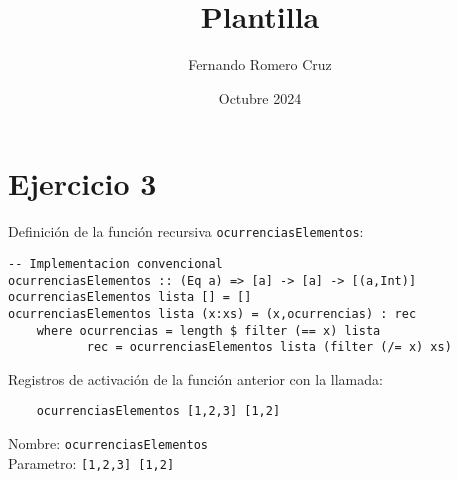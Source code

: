 \documentclass{article}
\title{Plantilla}
\author{Fernando Romero Cruz}
\date{Octubre 2024}
\begin{document}
\maketitle

\section*{Ejercicio 3}

Definición de la función recursiva \texttt{ocurrenciasElementos}:

\begin{lstlisting}
-- Implementacion convencional
ocurrenciasElementos :: (Eq a) => [a] -> [a] -> [(a,Int)]
ocurrenciasElementos lista [] = []
ocurrenciasElementos lista (x:xs) = (x,ocurrencias) : rec
    where ocurrencias = length $ filter (== x) lista
           rec = ocurrenciasElementos lista (filter (/= x) xs)
\end{lstlisting}

Registros de activación de la función anterior con la llamada:
\begin{verbatim}
    ocurrenciasElementos [1,2,3] [1,2]
\end{verbatim}

Nombre: \texttt{ocurrenciasElementos}\\
Parametro: \texttt{[1,2,3] [1,2]}\\
\end{document}
